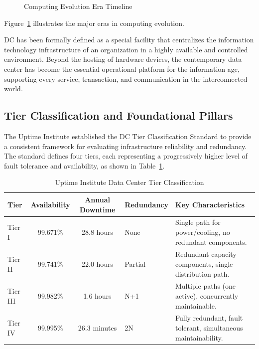 \begin{figure}[!htbp]
    \centering
    \ComputingEvolutionEra
    \caption{Computing Evolution Era Timeline}
    \label{fig:ComputingEvolutionEraTimeline}
\end{figure}
Figure~\ref{fig:ComputingEvolutionEraTimeline} illustrates the major eras in computing evolution.

DC has been formally defined as a special facility that centralizes the information technology infrastructure of an organization in a highly available and controlled environment\cite{Uptime_Institute_Tier_Certification}. Beyond the hosting of hardware devices, the contemporary data center has become the essential operational platform for the information age, supporting every service, transaction, and communication in the interconnected world.

\subsection*{Tier Classification and Foundational Pillars}
The Uptime Institute established the DC Tier Classification Standard to provide a consistent framework for evaluating infrastructure reliability and redundancy\cite{Uptime_Institute_Tier_Standard}. The standard defines four tiers, each representing a progressively higher level of fault tolerance and availability, as shown in Table~\ref{tab:datacenter_tiers}.

\begin{table}[!htbp]
    \centering
    \small
    \begin{tabularx}{\textwidth}{l c c l X}
        \toprule
        \textbf{Tier} & \textbf{Availability} & \textbf{Annual Downtime} & \textbf{Redundancy} & \textbf{Key Characteristics} \\
        \midrule
        Tier I   & 99.671\% & 28.8 hours & None & Single path for power/cooling, no redundant components. \\
        \midrule
        Tier II  & 99.741\% & 22.0 hours & Partial & Redundant capacity components, single distribution path. \\
        \midrule
        Tier III & 99.982\% & 1.6 hours & N+1 & Multiple paths (one active), concurrently maintainable. \\
        \midrule
        Tier IV  & 99.995\% & 26.3 minutes & 2N & Fully redundant, fault tolerant, simultaneous maintainability. \\
        \bottomrule
    \end{tabularx}
    \caption{ Uptime Institute Data Center Tier Classification\cite{Uptime_Institute_Tier_Standard}}
    \label{tab:datacenter_tiers}
\end{table}

